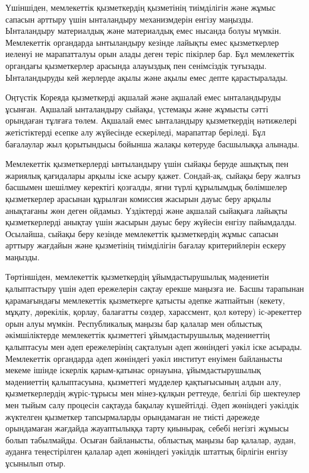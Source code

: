 Үшіншіден, мемлекеттік қызметкердің қызметінің тиімділігін және жұмыс
сапасын арттыру үшін ынталандыру механизмдерін енгізу маңызды.
Ынталандыру материалдық және материалдық емес нысанда болуы мүмкін.
Мемлекеттік органдарда ынтыландыру кезінде лайықты емес қызметкерлер
иеленуі не марапатталуы орын алады деген теріс пікірлер бар. Бұл
мемлекеттік органдағы қызметкерлер арасында алауыздық пен сенімсіздік
туғызады. Ынталандыруды кей жерлерде ақылы және ақылы емес депте
қарастыралады.

Оңтүстік Кореяда қызметкерді ақшалай және ақшалай емес ынталандыруды
ұсынған. Ақшалай ынталандыру сыйақы, үстемақы және жұмысты сәтті
орындаған тұлғаға төлем. Ақшалай емес ынталандыру қызметкердің
нәтижелері жетістіктерді есепке алу жүйесінде ескеріледі, марапаттар
беріледі. Бұл бағалаулар жыл қорытындысы бойынша жалақы көтеруде
басшылыққа алынады.

Мемлекеттік қызметкерлерді ынтыландыру үшін сыйақы беруде ашықтық пен
жариялық қағидалары арқылы іске асыру қажет. Сондай-ақ, сыйақы беру
жалғыз басшымен шешілмеу керектігі қозғалды, яғни түрлі құрылымдық
бөлімшелер қызметкерлер арасынан құрылған комиссия жасырын дауыс беру
арқылы анықтағаны жөн деген ойдамыз. Үздіктерді және ақшалай сыйақыға
лайықты қызметкерлерді анықтау үшін жасырын дауыс беру жүйесін енгізу
пайымдалды. Осылайша, сыйақы беру кезінде мемлекеттік қызметкердің жұмыс
сапасын арттыру жағдайын және қызметінің тиімділігін бағалау
критерийлерін ескеру маңызды.

Төртіншіден, мемлекеттік қызметкердің ұйымдастырушылық мәдениетін
қалыптастыру үшін әдеп ережелерін сақтау ерекше маңызға ие. Басшы
тарапынан қарамағындағы мемлекеттік қызметкерге қатысты әдепке жатпайтын
(кекету, мұқату, дөрекілік, қорлау, балағатты сөздер, харассмент, қол
көтеру) іс-әрекеттер орын алуы мүмкін. Республикалық маңызы бар қалалар
мен облыстық әкімшіліктерде мемлекеттік қызметтегі ұйымдастырушылық
мәдениеттің қалыптасуы мен әдеп ережелерінің сақталуын әдеп жөніндегі
уәкіл іске асырады. Мемлекеттік органдарда әдеп жөніндегі уәкіл институт
енуімен байланысты мекеме ішінде іскерлік қарым-қатынас орнауына,
ұйымдастырушылық мәдениеттің қалыптасуына, қызметтегі мүдделер
қақтығысының алдын алу, қызметкерлердің жүріс-тұрысы мен мінез-құлқын
реттеуде, белгілі бір шектеулер мен тыйым салу процесін сақтауда бақылау
күшейтілді. Әдеп жөніндегі уәкілдік жүктелген қызметкер тапсырмаларды
орындамаған не тиісті дәрежеде орындамаған жағдайда жауаптылыққа тарту
қиынырақ, себебі негізгі жұмысы болып табылмайды. Осыған байланысты,
облыстық маңызы бар қалалар, аудан, ауданға теңестірілген қалалар әдеп
жөніндегі уәкілдік штаттық бірлігін енгізу ұсынылып отыр.

